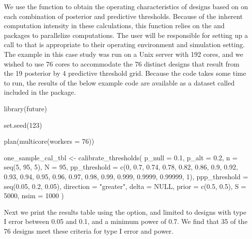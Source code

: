 We use the  function to obtain the
operating characteristics of designs based on on each combination of
posterior and predictive thresholds. Because of the inherent computation
intensity in these calculations, this function relies on the
 \citep{Bengtsson2020} and 
\citep{Vaughan2021} packages to parallelize computations. The user will
be responsible for setting up a call to  that is
appropriate to their operating environment and simulation setting. The
example in this case study was run on a Unix server with 192 cores, and
we wished to use 76 cores to accommodate the 76 distinct designs that
result from the 19 posterior by 4 predictive threshold grid. Because the
code takes some time to run, the results of the below example code are
available as a dataset called  included in
the  package.

\begin{Schunk}
\begin{Sinput}
library(future)

set.seed(123)

plan(multicore(workers = 76))

one_sample_cal_tbl <- 
  calibrate_thresholds(
    p_null = 0.1, 
    p_alt = 0.2, 
    n = seq(5, 95, 5),
    N = 95, 
    pp_threshold = c(0, 0.7, 0.74, 0.78, 0.82, 0.86, 0.9, 0.92, 0.93, 0.94, 
                     0.95, 0.96, 0.97, 0.98, 0.99, 0.999, 0.9999, 0.99999, 1),
    ppp_threshold = seq(0.05, 0.2, 0.05),
    direction = "greater", 
    delta = NULL, 
    prior = c(0.5, 0.5), 
    S = 5000, 
    nsim = 1000
    )
\end{Sinput}
\end{Schunk}

Next we print the results table using the  option, and
limited to designs with type I error between 0.05 and 0.1, and a minimum
power of 0.7. We find that 35 of the 76 designs meet these criteria for
type I error and power.

